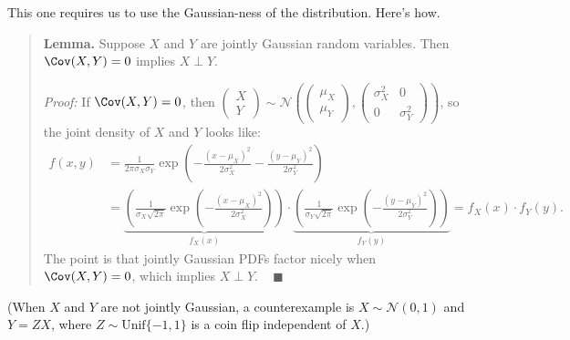 \begin{solution}
    This one requires us to use the Gaussian-ness of the distribution.
    Here's how.
    \begin{quote}
        \textbf{Lemma.} Suppose $X$ and $Y$ are jointly Gaussian random variables.
        Then $\Cov(X, Y) = 0$ implies $X \perp Y$.

        \emph{Proof:} If $\Cov(X, Y) = 0$, then $\begin{pmatrix} X \\ Y \end{pmatrix}
        \sim \mathcal{N}\left(\begin{pmatrix} \mu_X \\ \mu_Y \end{pmatrix},
        \begin{pmatrix} \sigma_X^2 & 0 \\ 0 & \sigma_Y^2 \end{pmatrix}\right)$,
        so the joint density of $X$ and $Y$ looks like:
        \begin{align*} f(x, y) & = \frac{1}{2\pi \sigma_X \sigma_Y}
        \exp\left(-\frac{(x - \mu_X)^2}{2\sigma_X^2} - \frac{(y - \mu_Y)^2}{2\sigma_Y^2}\right) \\
        & = \underbrace{\left(\frac{1}{\sigma_X \sqrt{2\pi}}
        \exp\left(-\frac{(x - \mu_X)^2}{2\sigma_X^2}\right)\right)}_{f_X(x)} \cdot
        \underbrace{\left(\frac{1}{\sigma_Y \sqrt{2\pi}}
        \exp\left(-\frac{(y - \mu_Y)^2}{2\sigma_Y^2}\right)\right)}_{f_Y(y)}
        = f_X(x) \cdot f_Y(y). \end{align*}
        The point is that jointly Gaussian PDFs factor nicely when $\Cov(X, Y) = 0$,
        which implies $X \perp Y$. ~ $\blacksquare$
    \end{quote}
    (When $X$ and $Y$ are not jointly Gaussian, 
    a counterexample is $X \sim \mathcal{N}(0, 1)$
    and $Y = ZX$, where $Z \sim \mathrm{Unif}\{-1, 1\}$ is
    a coin flip independent of $X$.)


\end{solution}
